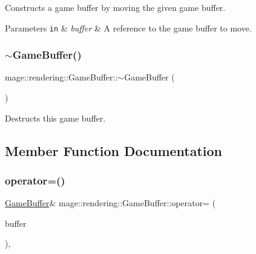 Constructs a game buffer by moving the given game buffer.


\begin{DoxyParams}[1]{Parameters}
\mbox{\tt in}  & {\em buffer} & A reference to the game buffer to move. \\
\hline
\end{DoxyParams}
\hypertarget{structmage_1_1rendering_1_1_game_buffer_a7cf8e2d277f99d447af729a6a92fe572}{}\label{structmage_1_1rendering_1_1_game_buffer_a7cf8e2d277f99d447af729a6a92fe572} 
\subsubsection{\texorpdfstring{$\sim$\+Game\+Buffer()}{~GameBuffer()}}
{\footnotesize\ttfamily mage\+::rendering\+::\+Game\+Buffer\+::$\sim$\+Game\+Buffer (\begin{DoxyParamCaption}{ }\end{DoxyParamCaption})\hspace{0.3cm}{\ttfamily [default]}}

Destructs this game buffer. 

\subsection{Member Function Documentation}
\hypertarget{structmage_1_1rendering_1_1_game_buffer_a44db86bb85f9fcf7dea1345ed9416aa3}{}\label{structmage_1_1rendering_1_1_game_buffer_a44db86bb85f9fcf7dea1345ed9416aa3} 
\subsubsection{\texorpdfstring{operator=()}{operator=()}\hspace{0.1cm}{\footnotesize\ttfamily [1/2]}}
{\footnotesize\ttfamily \hyperlink{structmage_1_1rendering_1_1_game_buffer}{Game\+Buffer}\& mage\+::rendering\+::\+Game\+Buffer\+::operator= (\begin{DoxyParamCaption}\item[{const \hyperlink{structmage_1_1rendering_1_1_game_buffer}{Game\+Buffer} \&}]{buffer }\end{DoxyParamCaption})\hspace{0.3cm}{\ttfamily [default]}, {\ttfamily [noexcept]}}


